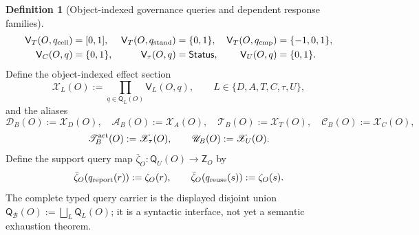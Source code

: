 \documentclass[11pt]{article}
\theoremstyle{definition}
\newtheorem{definition}[theorem]{Definition}
\newcommand{\Bell}{\mathcal{B}}
\begin{document}
\begin{definition}[Object-indexed governance queries and dependent response families]
\[\begin{aligned}
\mathsf V_T(O,q_{\rm cell})&=[0,1],&
\mathsf V_T(O,q_{\rm stand})&=\{0,1\},&
\mathsf V_T(O,q_{\rm cmp})&=\{-1,0,1\},\\
\mathsf V_C(O,q)&=\{0,1\},&
\mathsf V_{\tau}(O,q)&=\mathsf{Status},&
\mathsf V_U(O,q)&=\{0,1\}.
\end{aligned}
\]
Define the object-indexed effect section
\[
\mathscr X_L(O):=\prod_{q\in\mathsf Q_L(O)}\mathsf V_L(O,q),
\qquad L\in\{D,A,T,C,\tau,U\},
\]
and the aliases
\[
\mathscr D_B(O):=\mathscr X_D(O),\quad \mathscr A_B(O):=\mathscr X_A(O),\quad
\mathscr T_B(O):=\mathscr X_T(O),\quad \mathscr C_B(O):=\mathscr X_C(O),
\]
\[
\mathscr T_B^{\rm act}(O):=\mathscr X_{\tau}(O),\qquad
\mathscr U_B(O):=\mathscr X_U(O).
\]
Define the support query map $\bar\zeta_O:\mathsf Q_U(O)\to\mathsf Z_O$ by
\[
\bar\zeta_O(q_{\rm report}(r)):=\zeta_O(r),\qquad
\bar\zeta_O(q_{\rm reuse}(s)):=\zeta_O(s).
\]
The complete typed query carrier is the displayed disjoint union
$\mathsf Q_{\Bell}(O):=\bigsqcup_L\mathsf Q_L(O)$; it is a syntactic interface, not yet a semantic exhaustion theorem.
\end{definition}
\end{document}
